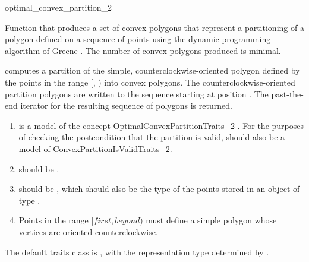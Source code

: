 \begin{ccRefFunction}{optimal_convex_partition_2}

Function that produces a set of convex polygons 
that represent a partitioning of a polygon defined on a sequence of 
points using the dynamic programming algorithm of Greene \cite{g-dpcp-83}.  
The number of convex polygons produced is minimal.



{
computes a partition of the simple, counterclockwise-oriented polygon defined
by the points in the range [, ) into convex
polygons. The counterclockwise-oriented partition polygons are written to
the sequence starting at position .  The past-the-end iterator for
the resulting sequence of polygons is returned.
}

\begin{enumerate}
    \item {} is a model of the concept OptimalConvexPartitionTraits\_2%
          .
          For the purposes of checking the
          postcondition that the partition is valid,  should
          also be a model of ConvexPartitionIsValidTraits\_2.
    \item {} should be
          .
    \item {} should be ,
          which should also be the type of the points stored in an object
          of type .
    \item Points in the range $[first, beyond)$ must define a simple polygon
          whose vertices are oriented counterclockwise.
\end{enumerate}

The default traits class  is ,%
with the representation type determined by .


\end{ccRefFunction}

